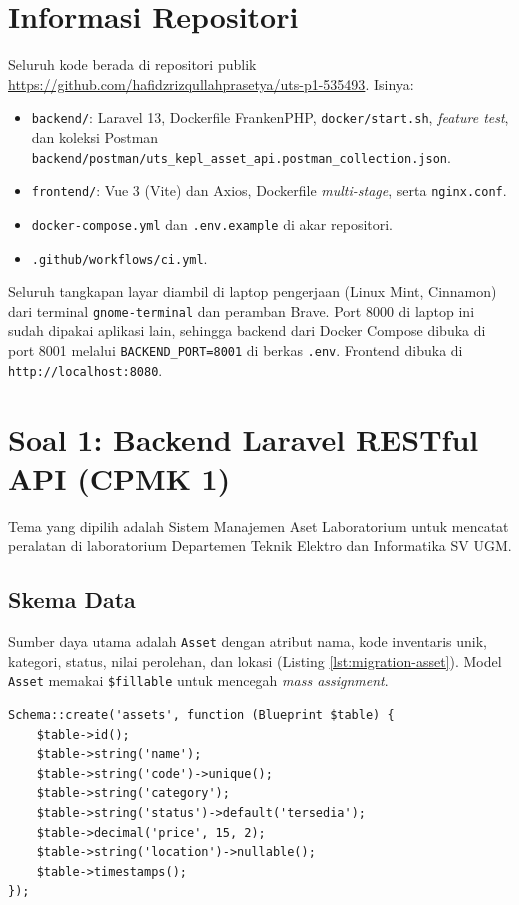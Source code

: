 \documentclass[a4paper,oneside,12pt]{report}
\begin{document}
\section{Informasi Repositori}
Seluruh kode berada di repositori publik \url{https://github.com/hafidzrizqullahprasetya/uts-p1-535493}. Isinya:
\begin{itemize}
    \item \texttt{backend/}: Laravel 13, Dockerfile FrankenPHP, \texttt{docker/start.sh}, \textit{feature test}, dan koleksi Postman \nolinkurl{backend/postman/uts_kepl_asset_api.postman_collection.json}.
    \item \texttt{frontend/}: Vue 3 (Vite) dan Axios, Dockerfile \textit{multi-stage}, serta \texttt{nginx.conf}.
    \item \texttt{docker-compose.yml} dan \texttt{.env.example} di akar repositori.
    \item \texttt{.github/workflows/ci.yml}.
\end{itemize}

Seluruh tangkapan layar diambil di laptop pengerjaan (Linux Mint, Cinnamon) dari terminal \texttt{gnome-terminal} dan peramban Brave. Port 8000 di laptop ini sudah dipakai aplikasi lain, sehingga backend dari Docker Compose dibuka di port 8001 melalui \texttt{BACKEND\_PORT=8001} di berkas \texttt{.env}. Frontend dibuka di \texttt{http://localhost:8080}.

\section{Soal 1: Backend Laravel RESTful API (CPMK 1)}
Tema yang dipilih adalah Sistem Manajemen Aset Laboratorium untuk mencatat peralatan di laboratorium Departemen Teknik Elektro dan Informatika SV UGM.

\subsection{Skema Data}
Sumber daya utama adalah \texttt{Asset} dengan atribut nama, kode inventaris unik, kategori, status, nilai perolehan, dan lokasi (Listing \ref{lst:migration-asset}). Model \texttt{Asset} memakai \texttt{\$fillable} untuk mencegah \textit{mass assignment}.

\begin{lstlisting}[style=phpstyle,caption={Migrasi tabel assets.},label={lst:migration-asset}]
Schema::create('assets', function (Blueprint $table) {
    $table->id();
    $table->string('name');
    $table->string('code')->unique();
    $table->string('category');
    $table->string('status')->default('tersedia');
    $table->decimal('price', 15, 2);
    $table->string('location')->nullable();
    $table->timestamps();
});
\end{lstlisting}
\end{document}
